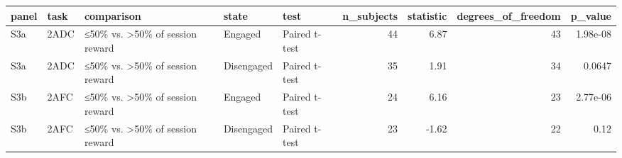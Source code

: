 \begin{tabular}{lllllrrrr}
\toprule
panel & task & comparison & state & test & n\_subjects & statistic & degrees\_of\_freedom & p\_value \\
\midrule
S3a & 2ADC & ≤50\% vs. >50\% of session reward & Engaged & Paired t-test & 44 & 6.87 & 43 & 1.98e-08 \\
S3a & 2ADC & ≤50\% vs. >50\% of session reward & Disengaged & Paired t-test & 35 & 1.91 & 34 & 0.0647 \\
S3b & 2AFC & ≤50\% vs. >50\% of session reward & Engaged & Paired t-test & 24 & 6.16 & 23 & 2.77e-06 \\
S3b & 2AFC & ≤50\% vs. >50\% of session reward & Disengaged & Paired t-test & 23 & -1.62 & 22 & 0.12 \\
\bottomrule
\end{tabular}
